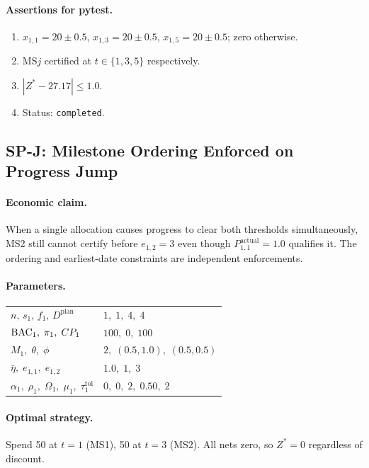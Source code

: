 \paragraph{Assertions for pytest.}
\begin{enumerate}[label=A\arabic*.]
  \item $x_{1,1}=20\pm0.5$, $x_{1,3}=20\pm0.5$, $x_{1,5}=20\pm0.5$;
    zero otherwise.
  \item MS$j$ certified at $t\in\{1,3,5\}$ respectively.
  \item $|Z^*-27.17|\leq1.0$.
  \item Status: \texttt{completed}.
\end{enumerate}

\subsection{SP-J: Milestone Ordering Enforced on Progress Jump}

\paragraph{Economic claim.}
When a single allocation causes progress to clear both thresholds
simultaneously, MS2 still cannot certify before $e_{1,2}=3$ even
though $P_{1,1}^{\mathrm{actual}}=1.0$ qualifies it. The ordering
and earliest-date constraints are independent enforcements.

\paragraph{Parameters.}
\begin{center}
\begin{tabular}{ll}
\toprule
$n,\,s_1,\,f_1,\,D^{\mathrm{plan}}$ & $1,\;1,\;4,\;4$\\
$\mathrm{BAC}_1,\;\pi_1,\;CP_1$ & $100,\;0,\;100$\\
$M_1,\;\theta,\;\phi$ & $2,\;(0.5,1.0),\;(0.5,0.5)$\\
$\bar\eta,\;e_{1,1},\;e_{1,2}$ & $1.0,\;1,\;3$\\
$\alpha_1,\;\rho_1,\;\Omega_1,\;\mu_1,\;\tau_1^{\mathrm{tol}}$ &
  $0,\;0,\;2,\;0.50,\;2$\\
\bottomrule
\end{tabular}
\end{center}

\paragraph{Optimal strategy.}
Spend 50 at $t=1$ (MS1), 50 at $t=3$ (MS2). All nets zero, so
$Z^*=0$ regardless of discount.

